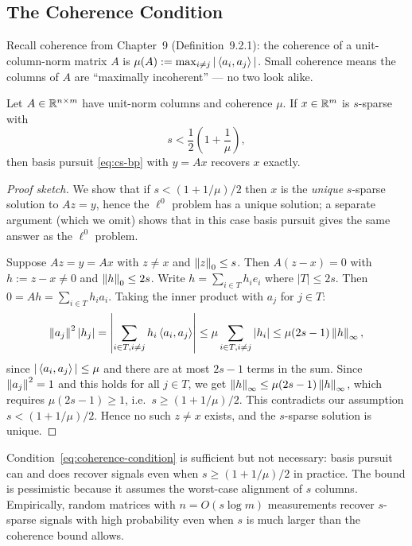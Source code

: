 \subsection{The Coherence Condition}
\label{subsec:coherence-condition}

Recall coherence from Chapter~9 (Definition~9.2.1): the coherence of
a unit-column-norm matrix $A$ is $\mu(A) := \max_{i\ne j}
|\left\langle a_i, a_j \right\rangle|$. Small coherence means the columns of $A$ are
``maximally incoherent'' --- no two look alike.

\begin{theorem}
\label{thm:coherence-recovery}
Let $A\in\mathbb{R}^{n\times m}$ have unit-norm columns and coherence $\mu$.
If $x\in\mathbb{R}^m$ is $s$-sparse with
\begin{equation}
\label{eq:coherence-condition}
  s < \frac{1}{2}\!\left(1 + \frac{1}{\mu}\right),
\end{equation}
then basis pursuit \eqref{eq:cs-bp} with $y=Ax$ recovers $x$ exactly.
\end{theorem}

\begin{proof}[Proof sketch]
We show that if $s < (1+1/\mu)/2$ then $x$ is the \emph{unique}
$s$-sparse solution to $Az=y$, hence the $\ell^0$ problem has a unique
solution; a separate argument (which we omit) shows that in this case
basis pursuit gives the same answer as the $\ell^0$ problem.

Suppose $Az=y=Ax$ with $z\ne x$ and $\left\| z \right\|_0\le s$. Then $A(z-x)=0$
with $h := z-x \ne 0$ and $\left\| h \right\|_0 \le 2s$. Write
$h=\sum_{i\in T}h_i e_i$ where $|T|\le 2s$. Then $0=Ah=\sum_{i\in T}
h_i a_i$. Taking the inner product with $a_j$ for $j\in T$:
\[
  \left\| a_j \right\|^2 |h_j|
  = \left|\sum_{i\in T,i\ne j} h_i\left\langle a_i, a_j \right\rangle\right|
  \le \mu \sum_{i\in T,i\ne j}|h_i|
  \le \mu(2s-1)\left\| h \right\|_\infty,
\]
since $|\left\langle a_i, a_j \right\rangle|\le\mu$ and there are at most $2s-1$ terms
in the sum. Since $\left\| a_j \right\|^2=1$ and this holds for all $j\in T$,
we get $\left\| h \right\|_\infty \le \mu(2s-1)\left\| h \right\|_\infty$, which requires
$\mu(2s-1)\ge1$, i.e.\ $s\ge(1+1/\mu)/2$. This contradicts our
assumption $s<(1+1/\mu)/2$. Hence no such $z\ne x$ exists, and the
$s$-sparse solution is unique.
\end{proof}

\begin{remark*}
Condition~\eqref{eq:coherence-condition} is sufficient but not
necessary: basis pursuit can and does recover signals even when
$s\ge(1+1/\mu)/2$ in practice. The bound is pessimistic because
it assumes the worst-case alignment of $s$ columns. Empirically,
random matrices with $n = O(s\log m)$ measurements recover $s$-sparse
signals with high probability even when $s$ is much larger than the
coherence bound allows.
\end{remark*}

